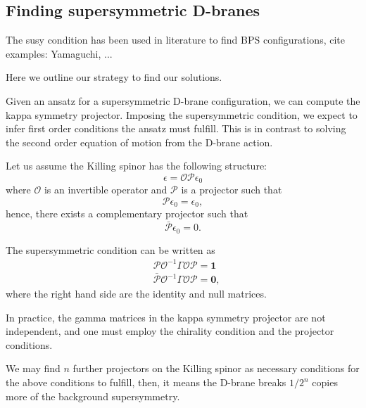 \subsection{Finding supersymmetric D-branes}
The susy condition has been used in literature to find BPS configurations, cite examples: Yamaguchi, ...

Here we outline our strategy to find our solutions.

Given an ansatz for a supersymmetric D-brane configuration, we can compute the kappa symmetry projector. 
Imposing the supersymmetric condition, we expect to infer first order conditions the ansatz must fulfill. 
This is in contrast to solving the second order equation of motion from the D-brane action.


Let us assume the Killing spinor has the following structure:
\begin{equation}
\epsilon = \mathcal{O} \mathcal{P} \epsilon_0
\end{equation}
where $\mathcal{O}$ is an invertible operator and $\mathcal{P}$ is a projector such that
\begin{equation}
    \mathcal{P} \epsilon_0 =  \epsilon_0,
\end{equation}
hence, there exists a complementary projector such that 
\begin{equation}
    \bar{\mathcal{P}} \epsilon_0 =  0.
\end{equation}

The supersymmetric condition can be written as
\begin{align}
&\mathcal{P} \mathcal{O}^{-1} \Gamma \mathcal{O} \mathcal{P} = \mathbf{1} \\
&\bar{\mathcal{P}} \mathcal{O}^{-1} \Gamma \mathcal{O} \mathcal{P}  = \mathbf{0},
\end{align}
where the right hand side are the identity and null matrices.

In practice, the gamma matrices in the kappa symmetry projector are not independent, and one must employ the chirality condition and the projector conditions. 

We may find $n$ further projectors on the Killing spinor as necessary conditions for the above conditions to fulfill, then, it means the D-brane breaks $1/2^n$ copies more of the background supersymmetry.

























